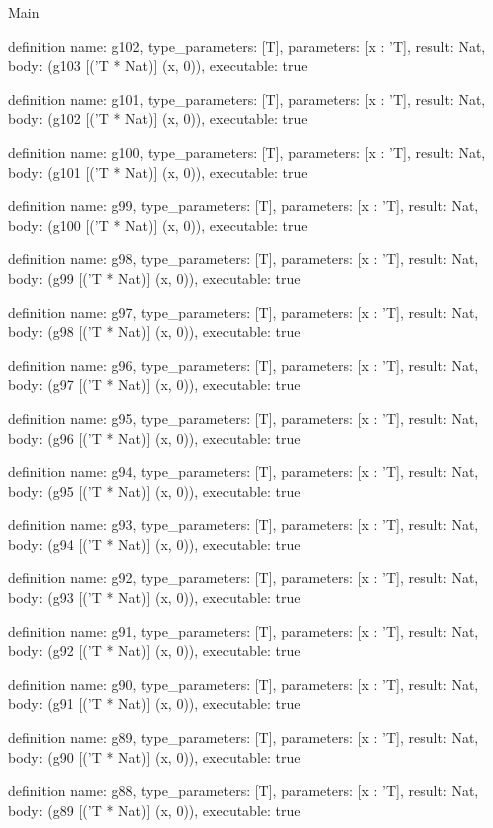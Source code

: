\begin{lexlean}{Main}
\begin{semanticmodule}
definition{
  name: g102,
  type_parameters: [T],
  parameters: [x : 'T],
  result: Nat,
  body: (g103 [('T * Nat)] (x, 0)),
  executable: true
}

definition{
  name: g101,
  type_parameters: [T],
  parameters: [x : 'T],
  result: Nat,
  body: (g102 [('T * Nat)] (x, 0)),
  executable: true
}

definition{
  name: g100,
  type_parameters: [T],
  parameters: [x : 'T],
  result: Nat,
  body: (g101 [('T * Nat)] (x, 0)),
  executable: true
}

definition{
  name: g99,
  type_parameters: [T],
  parameters: [x : 'T],
  result: Nat,
  body: (g100 [('T * Nat)] (x, 0)),
  executable: true
}

definition{
  name: g98,
  type_parameters: [T],
  parameters: [x : 'T],
  result: Nat,
  body: (g99 [('T * Nat)] (x, 0)),
  executable: true
}

definition{
  name: g97,
  type_parameters: [T],
  parameters: [x : 'T],
  result: Nat,
  body: (g98 [('T * Nat)] (x, 0)),
  executable: true
}

definition{
  name: g96,
  type_parameters: [T],
  parameters: [x : 'T],
  result: Nat,
  body: (g97 [('T * Nat)] (x, 0)),
  executable: true
}

definition{
  name: g95,
  type_parameters: [T],
  parameters: [x : 'T],
  result: Nat,
  body: (g96 [('T * Nat)] (x, 0)),
  executable: true
}

definition{
  name: g94,
  type_parameters: [T],
  parameters: [x : 'T],
  result: Nat,
  body: (g95 [('T * Nat)] (x, 0)),
  executable: true
}

definition{
  name: g93,
  type_parameters: [T],
  parameters: [x : 'T],
  result: Nat,
  body: (g94 [('T * Nat)] (x, 0)),
  executable: true
}

definition{
  name: g92,
  type_parameters: [T],
  parameters: [x : 'T],
  result: Nat,
  body: (g93 [('T * Nat)] (x, 0)),
  executable: true
}

definition{
  name: g91,
  type_parameters: [T],
  parameters: [x : 'T],
  result: Nat,
  body: (g92 [('T * Nat)] (x, 0)),
  executable: true
}

definition{
  name: g90,
  type_parameters: [T],
  parameters: [x : 'T],
  result: Nat,
  body: (g91 [('T * Nat)] (x, 0)),
  executable: true
}

definition{
  name: g89,
  type_parameters: [T],
  parameters: [x : 'T],
  result: Nat,
  body: (g90 [('T * Nat)] (x, 0)),
  executable: true
}

definition{
  name: g88,
  type_parameters: [T],
  parameters: [x : 'T],
  result: Nat,
  body: (g89 [('T * Nat)] (x, 0)),
  executable: true
}


\end{semanticmodule}
\end{lexlean}
